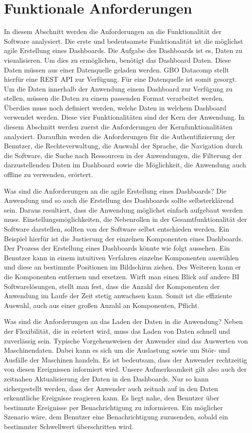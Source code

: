 \section{Funktionale Anforderungen}
\label{sec:funktionaleanforderungen}
In diesem Abschnitt werden die Anforderungen an die Funktionalität der Software analysiert.
Die erste und bedeutsamste Funktionalität ist
die möglichst agile Erstellung eines Dashboards. Die Aufgabe des Dashboards ist es, Daten
zu visualisieren. Um dies zu ermöglichen, benötigt das Dashboard Daten. Diese Daten
müssen aus einer Datenquelle geladen werden. GBO Datacomp stellt hierfür eine REST API
zur Verfügung. Für eine Datenquelle ist somit gesorgt. Um die Daten innerhalb der Anwendung
einem Dashboard zur Verfügung zu stellen, müssen die Daten zu einem passenden Format verarbeitet werden.
Überdies muss noch definiert werden, welche Daten in welchem Dashboard verwendet
werden. Diese vier Funktionalitäten sind der Kern der Anwendung. In diesem Abschnitt
werden zuerst die Anforderungen der Kernfunktionalitäten analysiert. Daraufhin werden die Anforderungen
für die Authentifizierung der Benutzer, die Rechteverwaltung, die Auswahl der Sprache,
die Navigation durch die Software, die Suche nach Ressourcen in der Anwendungen,
die Filterung der darzustellenden Daten im Dashboard sowie die Möglichkeit,
die Anwendung auch offline zu verwenden, erörtert.

Was sind die Anforderungen an die agile Erstellung eines Dashboards? Die Anwendung und
so auch die Erstellung des Dashboards sollte selbsterklärend sein. Daraus resultiert, 
dass die Anwendung möglichst einfach aufgebaut werden muss. Einstellungsmöglichkeiten,
die Nebenrollen in der Gesamtfunktionalität der Software darstellen, sollten von der
Software selbst entschieden werden. Ein Beispiel hierfür ist die Justierung der
einzelnen Komponenten eines Dashboards. Der Prozess der Erstellung eines Dashboards
könnte wie folgt aussehen. Ein Benutzer kann in einem intuitiven Verfahren
einzelne Komponenten auswählen und diese an bestimmte Positionen im Bildschirm
ziehen. Des Weiteren kann er die Komponenten
entfernen und ersetzen. Wirft man einen Blick auf andere BI Softwarelösungen,
stellt man fest, dass die Anzahl der Komponenten der Anwendung im Laufe der Zeit
stetig anwachsen kann. Somit ist die effiziente Auswahl, auch aus einer großen
Anzahl an Komponenten, Pflicht.

Was sind die Anforderungen an das Laden der Daten in die Anwendung? Neben der Flexibilität,
die in  erörtert wird, muss das Laden von Daten schnell und zuverlässig
sein. Typische Vorgehensweisen der Anwender sind das Auswerten von Maschinendaten. Dabei kann es
sich um die Auslastung sowie um Stör- und Ausfälle der Maschinen handeln. Es ist bedeutsam,
dass der Anwender rechtzeitig von diesen Ereignissen informiert wird. Unsere
Aufmerksamkeit gilt also auch der zeitnahen Aktualisierung der Daten in den Dashboards. Nur
so kann sichergestellt werden, dass der Anwender auch zeitnah auf in den Daten erkenntliche
Ereignisse reagieren kann. Es liegt nahe, den Benutzer
über bestimmte Ereignisse per Benachrichtigung zu informieren. Ein möglicher Szenario wäre,
dem Benutzer eine Benachrichtigung zuzusenden, sobald ein bestimmter Schwellwert überschritten
wird.

